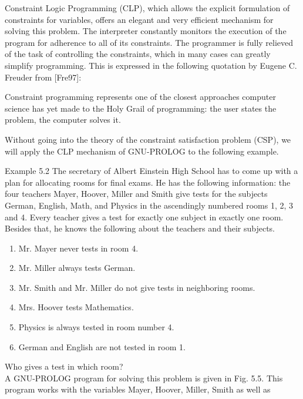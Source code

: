 \documentclass[10pt]{book}
\begin{document}
\begin{center}
Constraint Logic Programming (CLP), which allows the explicit formulation of constraints for variables, offers an elegant and very efficient mechanism for solving this problem. The interpreter constantly monitors the execution of the program for adherence to all of its constraints. The programmer is fully relieved of the task of controlling the constraints, which in many cases can greatly simplify programming. This is expressed in the following quotation by Eugene C. Freuder from [Fre97]:


\begin{displayquote}
Constraint programming represents one of the closest approaches computer science has yet made to the Holy Grail of programming: the user states the problem, the computer solves it.
\end{displayquote}

Without going into the theory of the constraint satisfaction problem (CSP), we will apply the CLP mechanism of GNU-PROLOG to the following example.

Example 5.2 The secretary of Albert Einstein High School has to come up with a plan for allocating rooms for final exams. He has the following information: the four teachers Mayer, Hoover, Miller and Smith give tests for the subjects German, English, Math, and Physics in the ascendingly numbered rooms 1, 2, 3 and 4. Every teacher gives a test for exactly one subject in exactly one room. Besides that, he knows the following about the teachers and their subjects.

\begin{enumerate}
  \item Mr. Mayer never tests in room 4.
  \item Mr. Miller always tests German.
  \item Mr. Smith and Mr. Miller do not give tests in neighboring rooms.
  \item Mrs. Hoover tests Mathematics.
  \item Physics is always tested in room number 4.
  \item German and English are not tested in room 1.
\end{enumerate}

Who gives a test in which room?\\
A GNU-PROLOG program for solving this problem is given in Fig. 5.5. This program works with the variables Mayer, Hoover, Miller, Smith as well as


\end{center}
\end{document}
